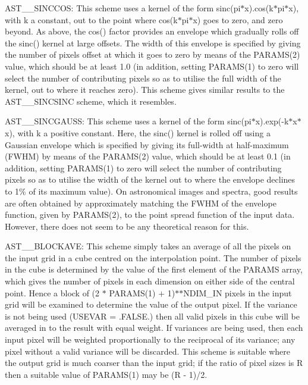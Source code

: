 \documentclass[twoside,11pt]{article}
\begin{document}
{{{         \sstitem
         AST\_\_SINCCOS: This scheme uses a kernel of the form
         sinc(pi$*$x).cos(k$*$pi$*$x), with k a constant, out to the point where
         cos(k$*$pi$*$x) goes to zero, and zero beyond. As above, the cos() factor
         provides an envelope which gradually rolls off the sinc() kernel
         at large offsets. The width of this envelope is specified by giving
         the number of pixels offset at which it goes to zero by means
         of the PARAMS(2) value, which should be at least 1.0 (in addition,
         setting PARAMS(1) to zero will select the number of contributing
         pixels so as to utilise the full width of the kernel, out to where it
         reaches zero). This scheme gives similar results to the
         AST\_\_SINCSINC scheme, which it resembles.

         \sstitem
         AST\_\_SINCGAUSS: This scheme uses a kernel of the form
         sinc(pi$*$x).exp(-k$*$x$*$x), with k a positive constant. Here, the sinc()
         kernel is rolled off using a Gaussian envelope which is specified by
         giving its full-width at half-maximum (FWHM) by means of the PARAMS(2)
         value, which should be at least 0.1 (in addition, setting PARAMS(1)
         to zero will select the number of contributing pixels so as to utilise
         the width of the kernel out to where the envelope declines to 1\% of its
         maximum value). On astronomical images and spectra, good results are
         often obtained by approximately matching the FWHM of the
         envelope function, given by PARAMS(2), to the point spread function
         of the input data. However, there does not seem to be any theoretical
         reason for this.

         \sstitem
         AST\_\_BLOCKAVE: This scheme simply takes an average of all the
         pixels on the input grid in a cube centred on the interpolation
         point.  The number of pixels in the cube is determined by the
         value of the first element of the PARAMS array, which gives
         the number of pixels in each dimension on either side of the
         central point.  Hence a block of (2 $*$ PARAMS(1) $+$ 1)$*$$*$NDIM\_IN
         pixels in the input grid will be examined to determine the
         value of the output pixel.  If the variance is not being used
         (USEVAR = .FALSE.) then all valid pixels in this cube
         will be averaged in to the result with equal weight.
         If variances are being used, then each input pixel will be
         weighted proportionally to the reciprocal of its variance; any
         pixel without a valid variance will be discarded.  This scheme
         is suitable where the output grid is much coarser than the
         input grid; if the ratio of pixel sizes is R then a suitable
         value of PARAMS(1) may be (R - 1)/2.

}}}
\end{document}
